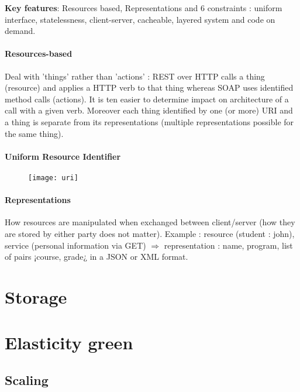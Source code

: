 \textbf{Key features}: Resources based, Representations and 6 constraints : uniform interface,
statelessness, client-server, cacheable, layered system and code on demand.

\subsubsection{Resources-based}

Deal with ’things’ rather than ’actions’ : REST over HTTP calls a thing (resource) and applies a HTTP verb to that thing whereas SOAP uses identified method calls (actions). It is ten easier to determine impact on architecture of a call with a given verb. Moreover each thing identified by one (or more) URI and a thing is separate from its representations (multiple representations possible for the same thing).

\subsubsection{Uniform Resource Identifier}

\begin{figure}[H]
    \centering
    \texttt{[image: uri]}
\end{figure}

\subsubsection{Representations}

How resources are manipulated when exchanged between client/server (how they are stored by either party does not matter). Example : resource (student : john), service (personal information via GET) $\Rightarrow$ representation : name, program, list of pairs ¡course, grade¿ in a JSON or XML format.

\chapter{Storage}

\chapter{Elasticity green}

\section{Scaling}

